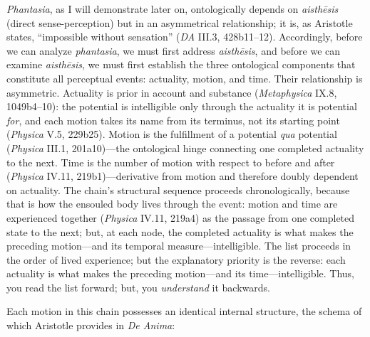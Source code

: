 \textit{Phantasia}, as I will demonstrate later on, ontologically depends on \textit{aisthēsis} (direct sense-perception) but in an asymmetrical relationship; it is, as Aristotle states, ``impossible without sensation'' (\textit{DA} III.3, 428b11--12). Accordingly, before we can analyze \textit{phantasia}, we must first address \textit{aisthēsis}, and before we can examine \textit{aisthēsis}, we must first establish the three ontological components that constitute all perceptual events: actuality, motion, and time. Their relationship is asymmetric. Actuality is prior in account and substance (\textit{Metaphysica} IX.8, 1049b4--10): the potential is intelligible only through the actuality it is potential \textit{for}, and each motion takes its name from its terminus, not its starting point (\textit{Physica} V.5, 229b25). Motion is the fulfillment of a potential \textit{qua} potential (\textit{Physica} III.1, 201a10)---the ontological hinge connecting one completed actuality to the next. Time is the number of motion with respect to before and after (\textit{Physica} IV.11, 219b1)---derivative from motion and therefore doubly dependent on actuality. The chain's structural sequence proceeds chronologically, because that is how the ensouled body lives through the event: motion and time are experienced together (\textit{Physica} IV.11, 219a4) as the passage from one completed state to the next; but, at each node, the completed actuality is what makes the preceding motion---and its temporal measure---intelligible. The list proceeds in the order of lived experience; but the explanatory priority is the reverse: each actuality is what makes the preceding motion---and its time---intelligible. Thus, you read the list forward; but, you \textit{understand} it backwards. 

Each motion in this chain possesses an identical internal structure, the schema of which Aristotle provides in \textit{De Anima}: 

